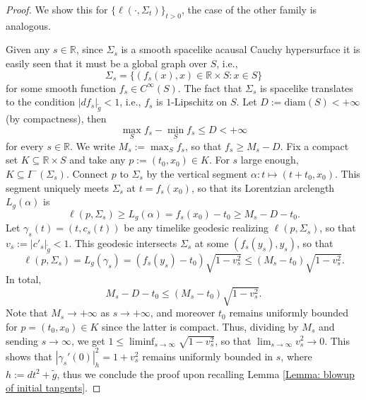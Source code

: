 \documentclass[10pt,a4paper]{amsart}
\newcommand{\R}{\mathbb R}
\begin{document}
\begin{proof}
    We show this for $\{\ell(\cdot,\Sigma_t)\}_{t > 0}$, the case of the other family is analogous.

    Given any $s \in \R$, since $\Sigma_s$ is a smooth spacelike acausal Cauchy hypersurface it is easily seen that it must be a global graph over $S$, i.e.,
    \begin{equation}
        \Sigma_s = \{(f_s(x),x) \in \R \times S : x \in S\}
    \end{equation}
    for some smooth function $f_s \in C^\infty(S)$. The fact that $\Sigma_s$ is spacelike translates to the condition $|df_s|_{\tilde g} < 1$, i.e., $f_s$ is $1$-Lipschitz on $S$. Let $D:=\mathrm{diam}(S) < +\infty$ (by compactness), then
    \begin{equation}
        \max_S f_s - \min_S f_s \leq D <+\infty
    \end{equation}
    for every $s \in \R$. We write $M_s:=\max_S f_s$, so that $f_s \geq M_s - D$. Fix a compact set $K \subseteq \R \times S$ and take any $p:=(t_0,x_0) \in K$. For $s$ large enough, $K \subseteq I^-(\Sigma_s)$. Connect $p$ to $\Sigma_s$ by the vertical segment $\alpha:t \mapsto (t + t_0,x_0)$. This segment uniquely meets $\Sigma_s$ at $t = f_s(x_0)$, so that its Lorentzian arclength 
    $ L_g(\alpha)$ is
    \begin{equation}
       \ell(p,\Sigma_s) \geq L_g(\alpha) = f_s(x_0) - t_0 \geq M_s - D - t_0.
    \end{equation}
    Let $\gamma_s(t) = (t,c_s(t))$ be any timelike geodesic realizing $\ell(p,\Sigma_s)$, so that $v_s:=| c'_s|_{\tilde g} < 1$. This geodesic intersects $\Sigma_s$ at some $(f_s(y_s),y_s)$, so that
    \begin{equation}
        \ell(p,\Sigma_s) = L_g(\gamma_s) = (f_s(y_s) - t_0) \sqrt{1 - v_s^2} \leq (M_s - t_0) \sqrt{1 - v_s^2}.
    \end{equation}
    In total,
    \begin{equation}
        M_s - D - t_0 \leq (M_s - t_0) \sqrt{1 - v_s^2}.
    \end{equation}
    Note that $M_s \to +\infty$ as $s \to +\infty$, and moreover $t_0$ remains uniformly bounded for $p = (t_0,x_0) \in K$ since the latter is compact. Thus, dividing by $M_s$ and sending $s \to \infty$, we get $1 \leq \liminf_{s \to \infty} \sqrt{1 - v_s^2}$, so that $\lim_{s \to \infty} v_s^2 \to 0$. This shows that $|\gamma_s'(0)|_h^2 = 1 + v_s^2$ remains uniformly bounded in $s$, where $h:=dt^2 + \tilde g$, thus we conclude the proof upon recalling Lemma \ref{Lemma: blowup of initial tangents}.
\end{proof}
\end{document}
